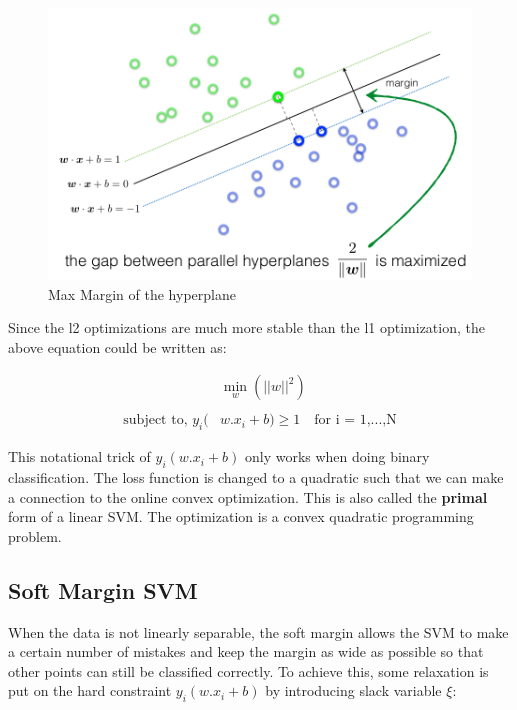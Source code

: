 \documentclass[11pt]{article}
\begin{document}
	\begin{figure}[h!]
    \centering
    \includegraphics[scale=0.4]{images/max_margin.png}
    \caption{Max Margin of the hyperplane}
    \label{fig:method}
    \end{figure}
	

Since the l2 optimizations are much more stable than the l1 optimization, the above equation could be written as\cite{ankit}:

	\begin{equation}
	\begin{aligned}
	&\min_{w} \left(||w||^2\right)\\ \\
	\text{subject to, }  y_i(&w.x_i + b) \geq 1 \text{   }
    \text{  for i = 1,...,N}
	\end{aligned}
	\end{equation}

This notational trick of $y_i(w.x_i + b)$ only works when doing binary classification. The loss function is changed to a quadratic such that we can make a connection to the online convex optimization. This is also called the \textbf{primal} form of a linear SVM. The optimization is a convex quadratic programming problem.  

\subsection{Soft Margin SVM}
When the data is not linearly separable, the soft margin allows the SVM to make a certain number of mistakes and keep the margin as wide as possible so that other points can still be classified correctly\cite{rishabh}. To achieve this, some relaxation is put on the hard constraint  $y_i(w.x_i + b)$ by introducing slack variable $\xi$:
\end{document}
